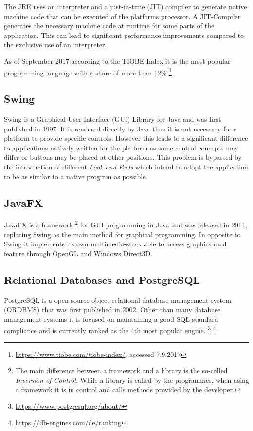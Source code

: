 The JRE uses an interpreter and a just-in-time (JIT) compiler to generate native machine code that can be executed of the platforms processor. A JIT-Compiler generates the necessary machine code at runtime for some parts of the application. This can lead to significant performance improvements compared to the exclusive use of an interpreter.

As of September 2017 according to the TIOBE-Index it is the most popular programming language with a share of more than 12\% \footnote{\href{https://www.tiobe.com/tiobe-index/}{https://www.tiobe.com/tiobe-index/}, accessed 7.9.2017}. 
\subsection{Swing}
\label{sec:swing}
Swing is a Graphical-User-Interface (GUI) Library for Java and was first published in 1997. It is rendered directly by Java thus it is not necessary for a platform to provide specific controls. However this leads to a significant difference to applications natively written for the platform as some control concepts may differ or buttons may be placed at other positions. This problem is bypassed by the introduction of different \emph{Look-and-Feels} which intend to adopt the application to be as similar to a native program as possible.

\subsection{JavaFX}
\label{sec:javafx}
JavaFX is a framework \footnote{The main difference between a framework and a library is the so-called \emph{Inversion of Control}. While a library is called by the programmer, when using a framework it is in control and calls methods provided by the developer.} for GUI programming in Java and was released in 2014, replacing Swing as the main method for graphical programming. In opposite to Swing it implements its own multimedia-stack able to access graphics card feature through OpenGL and Windows Direct3D.  

\subsection{Relational Databases and PostgreSQL}
\label{sec:postgres}
PostgreSQL is a open source object-relational database management system (ORDBMS) that was first published in 2002. Other than many database management systems it is focused on maintaining a good SQL standard compliance and is currently ranked as the 4th most popular engine. \footnote{ \href{https://www.postgresql.org/about/}{https://www.postgresql.org/about/}} \footnote{\href{https://db-engines.com/de/ranking}{https://db-engines.com/de/ranking}}

